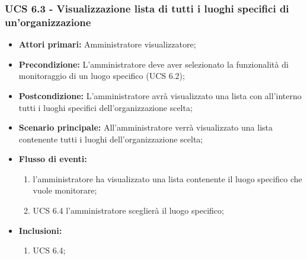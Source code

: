 \subsubsection{UCS 6.3 - Visualizzazione lista di tutti i luoghi specifici di un'organizzazione}
\begin{itemize}
	\item \textbf{Attori primari:} Amministratore visualizzatore;
	\item \textbf{Precondizione:} L'amministratore deve aver selezionato la funzionalità di monitoraggio di un luogo specifico (UCS 6.2);
	\item \textbf{Postcondizione:} L'amministratore avrà visualizzato una lista con all'interno tutti i luoghi specifici dell'organizzazione scelta;
	\item \textbf{Scenario principale:} All'amministratore verrà visualizzato una lista contenente tutti i luoghi dell'organizzazione scelta;
	\item \textbf{Flusso di eventi:} 
	\begin{enumerate}
		\item l'amministratore ha visualizzato una lista contenente il luogo specifico che vuole monitorare;
		\item UCS 6.4 l'amministratore sceglierà il luogo specifico;
	\end{enumerate}
	\item \textbf{Inclusioni:}
	\begin{enumerate}
		\item UCS 6.4;
	\end{enumerate}
\end{itemize}


